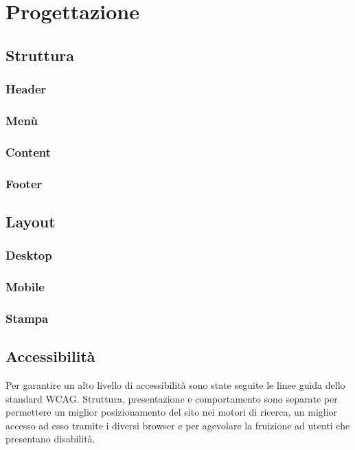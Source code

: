 \documentclass[12pt,a4paper,headings=optiontohead]{article}
\begin{document}
	
	
	
	
	
	
	\section{Progettazione}
	\subsection{Struttura}
	\subsubsection{Header}
	\subsubsection{Menù}
	\subsubsection{Content}
	\subsubsection{Footer}
	
	\subsection{Layout}
	\subsubsection{Desktop}
	\subsubsection{Mobile}
	\subsubsection{Stampa}
	
\subsection{Accessibilità}
	Per garantire un alto livello di accessibilità sono state seguite le linee guida dello standard WCAG. Struttura, presentazione e comportamento sono separate per permettere un miglior posizionamento del sito nei motori di ricerca, un miglior accesso ad esso tramite i diversi browser e per agevolare la fruizione ad utenti che presentano disabilità.
\end{document}
